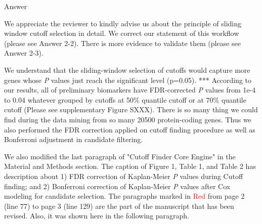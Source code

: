 \documentclass[preprint,12pt]{elsarticle}
\newenvironment{MyColorPar}[1]{%
    \leavevmode\color{#1}\ignorespaces%
}{%
}%
\begin{document}
%
\begin{MyColorPar}{blue}
Answer

We appreciate the reviewer to kindly advise us about the principle of sliding window cutoff selection in detail.
We correct our statement of this workflow (please see Answer 2-2).
There is more evidence to validate them (please see Answer 2-3).

We understand that the sliding-window selection of cutoffs would capture more genes whose \textit{P} values just reach the significant level (p=0.05).
*** According to our results, all of preliminary biomarkers have FDR-corrected \textit{P} values from 1e-4 to 0.04 whatever grouped by cutoffs at 50\% quantile cutoff or at 70\% quantile cutoff (Please see supplementary Figure SXXX).
There is so many thing we could find during the data mining from so many 20500 protein-coding genes.
Thus we also performed the FDR correction applied on cutoff finding procedure as well as Bonferroni adjustment in candidate filtering.



We also modified the last paragraph of "Cutoff Finder Core Engine" in the Material and Methods section.
The caption of Figure 1, Table 1, and Table 2 has description about 1) FDR correction of Kaplan-Meier \textit{P} values during Cutoff finding; and 2) Bonferroni correction of Kaplan-Meier \textit{P} values after Cox modeling for candidate selection.
The paragraphs marked in \textcolor{red}{Red} from page 2 (line 77) to page 3 (line 129) are the part of the manuscript that has been revised. Also, it was shown here in the following paragraph.
\\[0.3cm]

\begin{MyColorPar}{red}


\end{MyColorPar}
\end{MyColorPar}
\end{document}
